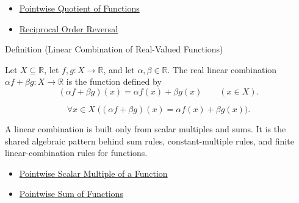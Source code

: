 \begin{dependencies}
\begin{itemize}
  \item \hyperref[def:pointwise-quotient-of-functions]{Pointwise Quotient of Functions}
  \item \hyperref[prop:reciprocal-order-reversal]{Reciprocal Order Reversal}
\end{itemize}
\end{dependencies}


\begin{definitionbox}{Definition (Linear Combination of Real-Valued Functions)}
\begin{definition}
\label{def:linear-combination-of-real-valued-functions}
Let $X\subseteq\mathbb{R}$, let $f,g:X\to\mathbb{R}$, and let
$\alpha,\beta\in\mathbb{R}$.  The real linear combination
$\alpha f+\beta g:X\to\mathbb{R}$ is the function defined by
\[
  (\alpha f+\beta g)(x)=\alpha f(x)+\beta g(x)
  \qquad (x\in X).
\]
\end{definition}
\end{definitionbox}

\begin{remark*}
\[
  \forall x\in X\;\bigl((\alpha f+\beta g)(x)=\alpha f(x)+\beta g(x)\bigr).
\]
\end{remark*}

\begin{remark*}[Interpretation]
A linear combination is built only from scalar multiples and sums. It is
the shared algebraic pattern behind sum rules, constant-multiple rules, and
finite linear-combination rules for functions.
\end{remark*}

\begin{dependencies}
\begin{itemize}
  \item \hyperref[def:pointwise-scalar-multiple-of-a-function]{Pointwise Scalar Multiple of a Function}
  \item \hyperref[def:pointwise-sum-of-functions]{Pointwise Sum of Functions}
\end{itemize}
\end{dependencies}

